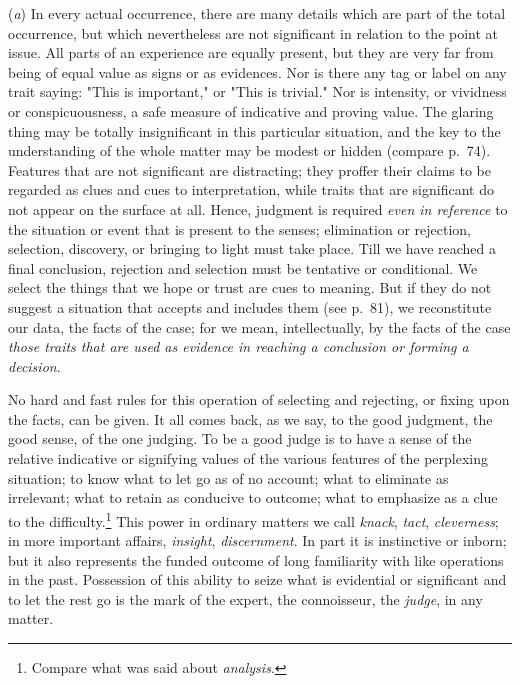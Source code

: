 \documentclass[letterpaper]{book}
\begin{document}
(\emph{a}) In every actual occurrence, there are many details which are
part of the total occurrence, but which nevertheless are not significant
in relation to the point at issue. All parts of an experience are
equally present, but they are very far from being of equal value as
signs or as evidences. Nor is there any tag or label on any trait
saying: "This is important," or "This is trivial." Nor is intensity, or
vividness or conspicuousness, a safe measure of indicative and proving
value. The glaring thing may be totally insignificant in this particular
situation, and the key to the understanding of the whole matter may be
modest or hidden (compare p.\ 74). Features that are not significant are
distracting; they proffer their claims to be regarded as clues and cues
to interpretation, while traits that are significant do not appear on
the surface at all. Hence, judgment is required \emph{even in reference}
to the situation or event that is present to the senses; elimination or
rejection, selection, discovery, or bringing to light must take
place.
Till we have reached a final conclusion, rejection and selection must be
tentative or conditional. We select the things that we hope or trust are
cues to meaning. But if they do not suggest a situation that accepts and
includes them (see p.\ 81), we reconstitute our data, the facts of the
case; for we mean, intellectually, by the facts of the case \emph{those
traits that are used as evidence in reaching a conclusion or forming a
decision}.


No hard and fast rules for this operation of selecting and rejecting, or
fixing upon the facts, can be given. It all comes back, as we say, to
the good judgment, the good sense, of the one judging. To be a good
judge is to have a sense of the relative indicative or signifying values
of the various features of the perplexing situation; to know what to let
go as of no account; what to eliminate as irrelevant; what to retain as
conducive to outcome; what to emphasize as a clue to the
difficulty.\footnote{ Compare what was said about \emph{analysis}. }
This power in ordinary matters we call \emph{knack}, \emph{tact},
\emph{cleverness}; in more important affairs, \emph{insight},
\emph{discernment}. In part it is instinctive or inborn; but it also
represents the funded outcome of long familiarity with like operations
in the past. Possession of this ability to seize what is evidential or
significant and to let the rest go is the mark of the expert, the
connoisseur, the \emph{judge}, in any matter.
\end{document}
